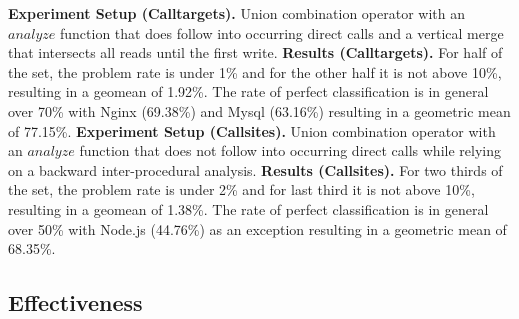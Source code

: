 \textbf{Experiment Setup (Calltargets).} Union combination operator with an $analyze$ function that does follow into occurring direct calls  and a vertical merge that intersects all reads until the first write.
\textbf{Results (Calltargets).} For half of the set, the problem rate is under 1\% and for the other half it is not above 10\%, resulting in a geomean of 1.92\%. The rate of perfect classification is in general over 70\% with Nginx (69.38\%) and Mysql (63.16\%)  resulting in a geometric mean of 77.15\%.
\textbf{Experiment Setup (Callsites).} Union combination operator with an $analyze$ function that does not follow into occurring direct calls while relying on a backward inter-procedural analysis.
\textbf{Results (Callsites).} For two thirds of the set, the problem rate is under 2\% and for last third it is not above 10\%, resulting in a geomean of 1.38\%.  The rate of perfect classification is in general over 50\% 
with Node.js (44.76\%) as an exception resulting in a geometric mean of 68.35\%.


%
%
%
%
\subsection{Effectiveness}
\label{section:typeshieldeffectiveness}


